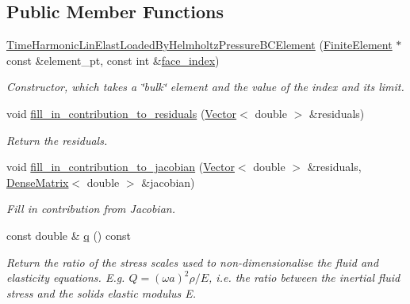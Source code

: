 \subsection*{Public Member Functions}
\begin{DoxyCompactItemize}
\item 
\hyperlink{classoomph_1_1TimeHarmonicLinElastLoadedByHelmholtzPressureBCElement_af0ac460cd2caeb9ba7c7b27e13d5ebc6}{Time\+Harmonic\+Lin\+Elast\+Loaded\+By\+Helmholtz\+Pressure\+B\+C\+Element} (\hyperlink{classoomph_1_1FiniteElement}{Finite\+Element} $\ast$const \&element\+\_\+pt, const int \&\hyperlink{classoomph_1_1FaceElement_a478d577ac6db67ecc80f1f02ae3ab170}{face\+\_\+index})
\begin{DoxyCompactList}\small\item\em Constructor, which takes a \char`\"{}bulk\char`\"{} element and the value of the index and its limit. \end{DoxyCompactList}\item 
void \hyperlink{classoomph_1_1TimeHarmonicLinElastLoadedByHelmholtzPressureBCElement_a0a69b95db2d95da34929a9750d3bce3d}{fill\+\_\+in\+\_\+contribution\+\_\+to\+\_\+residuals} (\hyperlink{classoomph_1_1Vector}{Vector}$<$ double $>$ \&residuals)
\begin{DoxyCompactList}\small\item\em Return the residuals. \end{DoxyCompactList}\item 
void \hyperlink{classoomph_1_1TimeHarmonicLinElastLoadedByHelmholtzPressureBCElement_a151fa0b3aa8df4a582d62d82ae42f40e}{fill\+\_\+in\+\_\+contribution\+\_\+to\+\_\+jacobian} (\hyperlink{classoomph_1_1Vector}{Vector}$<$ double $>$ \&residuals, \hyperlink{classoomph_1_1DenseMatrix}{Dense\+Matrix}$<$ double $>$ \&jacobian)
\begin{DoxyCompactList}\small\item\em Fill in contribution from Jacobian. \end{DoxyCompactList}\item 
const double \& \hyperlink{classoomph_1_1TimeHarmonicLinElastLoadedByHelmholtzPressureBCElement_af8f267ad94739fefd852796732eea1bd}{q} () const
\begin{DoxyCompactList}\small\item\em Return the ratio of the stress scales used to non-\/dimensionalise the fluid and elasticity equations. E.\+g. $ Q = (\omega a)^2 \rho/E $, i.\+e. the ratio between the inertial fluid stress and the solid\textquotesingle{}s elastic modulus E. \end{DoxyCompactList}\item 

\end{DoxyCompactItemize}
